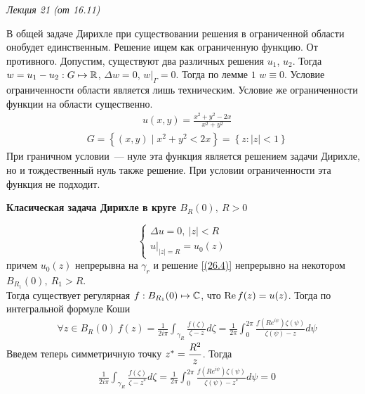 \begin{flushright}
    \textit{Лекция 21 (от 16.11)}
\end{flushright}
\theorem
В общей задаче Дирихле при существовании решения в ограниченной области онобудет
единственным. Решение ищем как ограниченную функцию.
\pr
От противного. Допустим, существуют два различных решения $u_1$, $u_2$. Тогда $w
= u_1-u_2 : G \mapsto \mathbb{R}$, $\Delta w = 0$, $w\Big|_\Gamma = 0$. Тогда по лемме
$1$ $w \equiv 0$.
\Note
Условие ограниченности области является лишь техническим. Условие же
ограниченности функции на области существенно.
\Example
\begin{align*}
  & u(x,y) = \frac{x^2+y^2-2x}{x^2+y^2}
\end{align*}
\begin{align*}
  & G = \left\{ (x,y) \mid x^2+y^2<2x \right\} = \left\{ z: \left| z \right| <1\right\}
\end{align*}
При граничном условии~--- нуле эта функция является решением задачи Дирихле, но
и тождественный нуль также решение. При условии ограниченности эта функция не
подходит.
\begin{center}
    \textbf{Класическая задача Дирихле в круге $B_R(0), \ R > 0$}
\end{center}
\begin{equation}\label{(26.4)}
    \begin{cases}
        \Delta u = 0, \ \left| z \right|< R \\
        u \big|_{\left| z \right| = R} = u_0(z)
    \end{cases}
\end{equation}
причем $u_0(z)$ непрерывна на $\gamma_r$ и решение \eqref{(26.4)} непрерывно на
некотором $B_{R_1}(0), \ R_1 > R$.
\\
Тогда существует регулярная $f: B_{R_1}(0) \mapsto \mathbb{C}$, что $\mathrm{Re}\, f(z) =
u(z)$. Тогда по интегральной формуле Коши
\begin{align*}
  & \forall z \in B_R(0) \ f(z) = \frac{1}{2 i \pi} \int_{\gamma_R} \frac{f(\zeta)}{\zeta - z}d\zeta = \frac{1}{2 \pi} \int_{0}^{2\pi} \frac{f(Re^{i\psi})\zeta(\psi)}{\zeta(\psi) - z}d\psi
\end{align*}
Введем теперь симметричную точку $z^* = \displaystyle \frac{R^2}{z}$. Тогда
\begin{align*}
  & \frac{1}{2 i \pi} \int_{\gamma_R} \frac{f(\zeta)}{\zeta - z^*}d\zeta = \frac{1}{2 \pi} \int_{0}^{2\pi} \frac{f(Re^{i\psi})\zeta(\psi)}{\zeta(\psi) - z^*}d\psi = 0
\end{align*}
